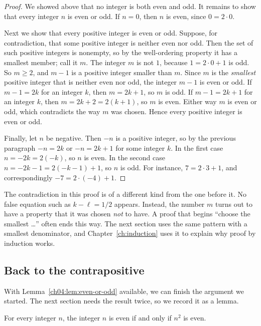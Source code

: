 \begin{proof}
We showed above that no integer is both even and odd. It remains to show that every integer $n$ is even or odd. If $n=0$, then $n$ is even, since $0=2\cdot0$.

Next we show that every positive integer is even or odd. Suppose, for contradiction, that some positive integer is neither even nor odd. Then the set of such positive integers is nonempty, so by the well-ordering property it has a smallest member; call it $m$. The integer $m$ is not $1$, because $1=2\cdot0+1$ is odd. So $m\ge2$, and $m-1$ is a positive integer smaller than $m$. Since $m$ is the \emph{smallest} positive integer that is neither even nor odd, the integer $m-1$ is even or odd. If $m-1=2k$ for an integer $k$, then $m=2k+1$, so $m$ is odd. If $m-1=2k+1$ for an integer $k$, then $m=2k+2=2(k+1)$, so $m$ is even. Either way $m$ is even or odd, which contradicts the way $m$ was chosen. Hence every positive integer is even or odd.

Finally, let $n$ be negative. Then $-n$ is a positive integer, so by the previous paragraph $-n=2k$ or $-n=2k+1$ for some integer $k$. In the first case $n=-2k=2(-k)$, so $n$ is even. In the second case $n=-2k-1=2(-k-1)+1$, so $n$ is odd. For instance, $7=2\cdot3+1$, and correspondingly $-7=2\cdot(-4)+1$.
\end{proof}

The contradiction in this proof is of a different kind from the one before it. No false equation such as $k-\ell=1/2$ appears. Instead, the number $m$ turns out to have a property that it was chosen \emph{not} to have. A proof that begins ``choose the smallest \ldots'' often ends this way. The next section uses the same pattern with a smallest denominator, and Chapter~\ref{ch:induction} uses it to explain why proof by induction works.

\subsection*{Back to the contrapositive}
With Lemma~\ref{ch04:lem:even-or-odd} available, we can finish the argument we started. The next section needs the result twice, so we record it as a lemma.

\par\noindent\begin{minipage}{\linewidth}
\begin{lemma}\label{thm:parity-square}
For every integer $n$, the integer $n$ is even if and only if $n^2$ is even.
\end{lemma}
\end{minipage}\par

